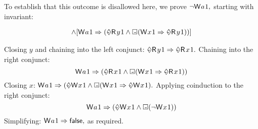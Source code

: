 \begin{example}
To establish that this outcome is disallowed here, we prove 
\begin{math}
  \lnot\DW{a}{1},
\end{math}
starting with invariant:
\begin{scope}
\small
\begin{align*}
  [\once\DW{y}{1} \Rightarrow \once\DR{x}{1}]
  \land
  [\notonce\DW{a}{1} \Rightarrow (\once\DR{y}{1} \land \always(\DW{x}{1} \Rightarrow \once\DR{y}{1}))]
\end{align*}
\end{scope}
Closing $y$ and chaining into the left conjunct:
\begin{math}
  \once\DR{y}{1} \Rightarrow \once\DR{x}{1}.
\end{math}
Chaining into the right conjunct:
\begin{displaymath}
  \notonce\DW{a}{1} \Rightarrow (\once\DR{x}{1} \land \always(\DW{x}{1} \Rightarrow \once\DR{x}{1}))
\end{displaymath}
Closing $x$:
\begin{math}
  \notonce\DW{a}{1} \Rightarrow (\once\DW{x}{1} \land \always(\DW{x}{1} \Rightarrow \once\DW{x}{1}).
\end{math}
Applying coinduction to the right conjunct:
\begin{displaymath}
  \notonce\DW{a}{1} \Rightarrow (\once\DW{x}{1} \land \always(\lnot \DW{x}{1}))
\end{displaymath}
Simplifying:
\begin{math}
  \notonce\DW{a}{1} \Rightarrow \FALSE,
\end{math}
as required.
\end{example}


